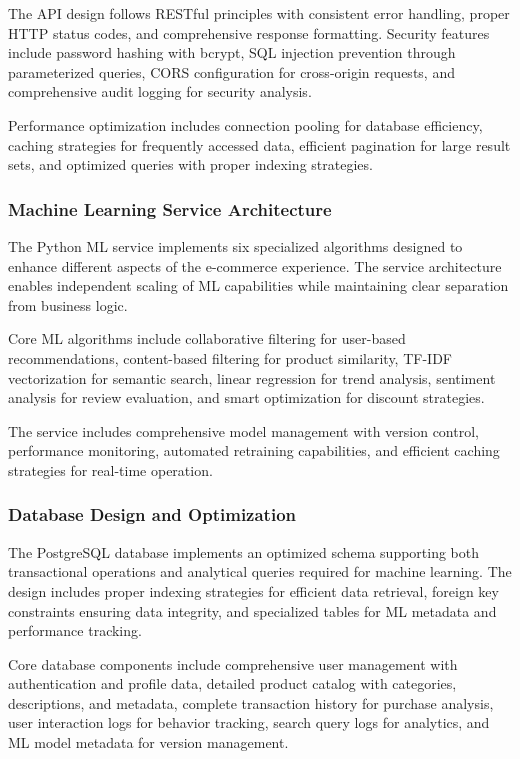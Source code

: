 \documentclass[12pt]{article}
\begin{document}
The API design follows RESTful principles with consistent error handling, proper HTTP status codes, and comprehensive response formatting. Security features include password hashing with bcrypt, SQL injection prevention through parameterized queries, CORS configuration for cross-origin requests, and comprehensive audit logging for security analysis.

Performance optimization includes connection pooling for database efficiency, caching strategies for frequently accessed data, efficient pagination for large result sets, and optimized queries with proper indexing strategies.

\subsubsection{Machine Learning Service Architecture}
The Python ML service implements six specialized algorithms designed to enhance different aspects of the e-commerce experience. The service architecture enables independent scaling of ML capabilities while maintaining clear separation from business logic.

Core ML algorithms include collaborative filtering for user-based recommendations, content-based filtering for product similarity, TF-IDF vectorization for semantic search, linear regression for trend analysis, sentiment analysis for review evaluation, and smart optimization for discount strategies.

The service includes comprehensive model management with version control, performance monitoring, automated retraining capabilities, and efficient caching strategies for real-time operation.

\subsubsection{Database Design and Optimization}
The PostgreSQL database implements an optimized schema supporting both transactional operations and analytical queries required for machine learning. The design includes proper indexing strategies for efficient data retrieval, foreign key constraints ensuring data integrity, and specialized tables for ML metadata and performance tracking.

Core database components include comprehensive user management with authentication and profile data, detailed product catalog with categories, descriptions, and metadata, complete transaction history for purchase analysis, user interaction logs for behavior tracking, search query logs for analytics, and ML model metadata for version management.
\end{document}
